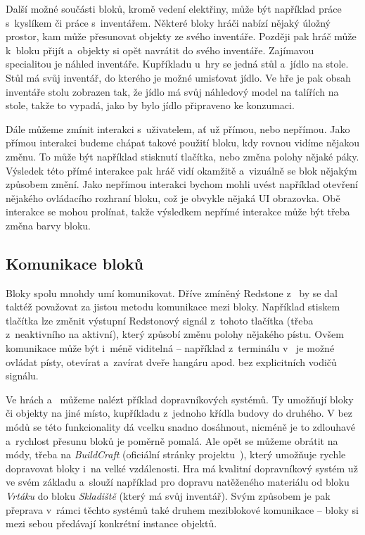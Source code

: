 Další možné součásti bloků, kromě vedení elektřiny, může být například práce s~kyslíkem či práce s~inventářem. Některé bloky hráči nabízí nějaký úložný prostor, kam může přesunovat objekty ze svého inventáře. Později pak hráč může k~bloku přijít a~objekty si opět navrátit do svého inventáře. Zajímavou specialitou je náhled inventáře. Kupříkladu u~hry \ME{} se jedná stůl a~jídlo na stole. Stůl má svůj inventář, do kterého je možné umisťovat jídlo. Ve hře je pak obsah inventáře stolu zobrazen tak, že jídlo má svůj náhledový model na talířích na stole, takže to vypadá, jako by bylo jídlo připraveno ke konzumaci. 


Dále můžeme zmínit interakci s~uživatelem, ať už přímou, nebo nepřímou. Jako přímou interakci budeme chápat takové použití bloku, kdy rovnou vidíme nějakou změnu. To může být například stisknutí tlačítka, nebo změna polohy nějaké páky. Výsledek této přímé interakce pak hráč vidí okamžitě a~vizuálně se blok nějakým způsobem změní. Jako nepřímou interakci bychom mohli uvést například otevření nějakého ovládacího rozhraní bloku, což je obvykle nějaká UI obrazovka. Obě interakce se mohou prolínat, takže výsledkem nepřímé interakce může být třeba změna barvy bloku.


\subsection{Komunikace bloků}
Bloky spolu mnohdy umí komunikovat. Dříve zmíněný Redstone z~ by se dal taktéž považovat za jistou metodu komunikace mezi bloky. Například stiskem tlačítka lze změnit výstupní Redstonový signál z~tohoto tlačítka (třeba z~neaktivního na aktivní), který způsobí změnu polohy nějakého pístu. Ovšem komunikace může být i~méně viditelná -- například z~terminálu v~\SE{} je možné ovládat písty, otevírat a~zavírat dveře hangáru apod. bez explicitních vodičů signálu.

Ve hrách \MC{} a~\SE{} můžeme nalézt příklad dopravníkových systémů. Ty umožňují  bloky či objekty na jiné místo, kupříkladu z~jednoho křídla budovy do druhého. V  bez módů se této funkcionality dá vcelku snadno dosáhnout, nicméně je to zdlouhavé a~rychlost přesunu bloků je poměrně pomalá. Ale opět se můžeme obrátit na módy, třeba na \textit{BuildCraft} (oficiální stránky projektu~\citep{buildcraft}), který umožňuje rychle dopravovat bloky i~na velké vzdálenosti. Hra \SE{} má kvalitní dopravníkový systém už ve svém základu a~slouží například pro dopravu natěženého materiálu od bloku \textit{Vrtáku} do bloku \textit{Skladiště} (který má svůj inventář). Svým způsobem je pak přeprava v~rámci těchto systémů také druhem meziblokové komunikace -- bloky si mezi sebou předávají konkrétní instance objektů.

